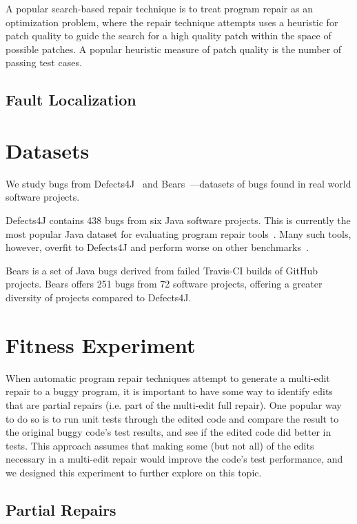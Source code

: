 \documentclass[sigconf, timestamp-false, anonymous=true]{acmart}
\begin{document}
A popular search-based repair technique is to treat program repair as an optimization 
problem, where the repair technique attempts uses a heuristic for patch quality to guide 
the search for a high quality patch within the space of possible patches. A popular heuristic
measure of patch quality is the number of passing test cases.

\subsection{Fault Localization}


\section{Datasets}
We study bugs from Defects4J~\cite{defects4j} and Bears~\cite{bears}---datasets of 
bugs found in real world software projects.

Defects4J contains 438 bugs from six Java software projects. This  
is currently the most popular Java dataset for evaluating program repair tools~\cite{durieux-repair-them-all}.
Many such tools, however, overfit to Defects4J and perform worse on other 
benchmarks~\cite{durieux-repair-them-all}. 

Bears is a set of Java bugs derived from failed Travis-CI builds of GitHub projects.
Bears offers 251 bugs from 72 software projects, offering a greater diversity of 
projects compared to Defects4J.

\section{Fitness Experiment}

When automatic program repair techniques attempt to generate a multi-edit repair to a buggy program, it is important to have some way to identify edits that are partial repairs (i.e. part of the multi-edit full repair). One popular way to do so is to run unit tests through the edited code and compare the result to the original buggy code's test results, and see if the edited code did better in tests. This approach assumes that making some (but not all) of the edits necessary in a multi-edit repair would improve the code's test performance, and we designed this experiment to further explore on this topic.


\subsection{Partial Repairs}
\end{document}
